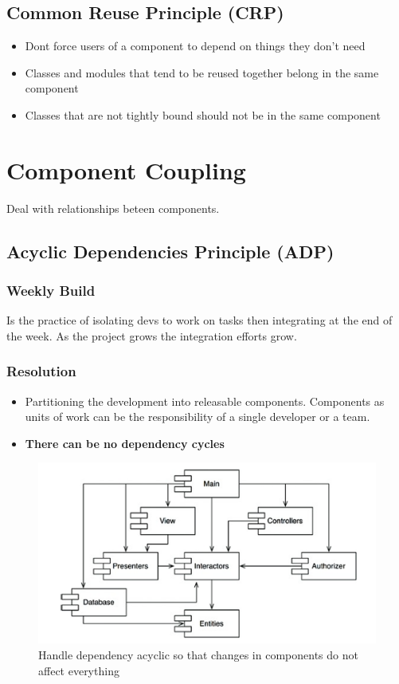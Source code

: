 \documentclass[../Main.tex]{subfiles}
\begin{document}
\subsection{Common Reuse Principle (CRP)}
\begin{itemize}
    \item Dont force users of a component to depend on things they don't need
    \item Classes and modules that tend to be reused together belong in the same component
    \item Classes that are not tightly bound should not be in the same component
\end{itemize}

\section{Component Coupling}
Deal with relationships beteen components.
\subsection{Acyclic Dependencies Principle (ADP)}

\subsubsection{Weekly Build}
Is the practice of isolating devs to work on tasks then integrating at the end of the week.
As the project grows the integration efforts grow.

\subsubsection{Resolution}
\begin{itemize}
    \item Partitioning the development into releasable components.
          Components as units of work can be the responsibility of a single developer or a team.
    \item \textbf{There can be no dependency cycles}
\end{itemize}
\begin{figure}[H]
    \centering
    \includegraphics[width=0.75\linewidth]{Images/cleanarch/dependency-cycle.png}
    \caption{Handle dependency acyclic so that changes in components do not affect everything}
\end{figure}
\end{document}
